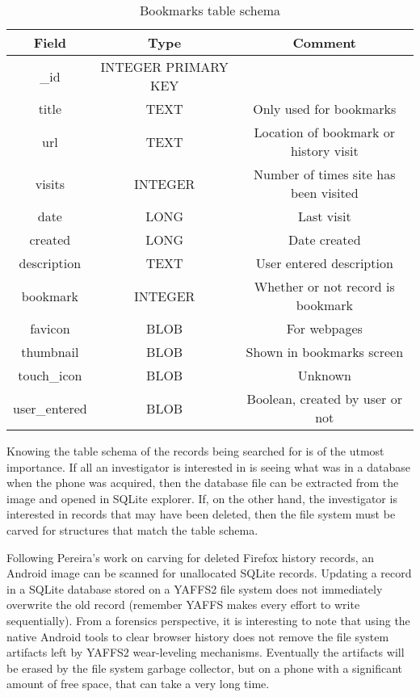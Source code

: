 \begin{table}[htb]
\begin {center}
	\begin{tabular}{| c | c | c |}
	\hline
	Field & Type & Comment \\
	\hline
	\_id & INTEGER PRIMARY KEY & \\
	title & TEXT  &  Only used for bookmarks \\
	url & TEXT  & Location of bookmark or history visit \\
	visits & INTEGER  & Number of times site has been visited \\
	date & LONG  &  Last visit \\
	created & LONG &  Date created \\
	description & TEXT &  User entered description \\
	bookmark & INTEGER & Whether or not record is bookmark \\
	favicon & BLOB &  For webpages \\
	thumbnail & BLOB &  Shown in bookmarks screen \\
	touch\_icon & BLOB &  Unknown \\
	user\_entered & BLOB & Boolean, created by user or not \\
	\hline
	\end{tabular}
\end{center}
	\caption{Bookmarks table schema}
	\label{tab:bookmarkschema}
\end{table}

Knowing the table schema of the records being searched for is of the utmost importance.  If all an investigator is interested in is
seeing what was in a database when the phone was acquired, then the database file can be extracted from the image and opened in
SQLite explorer.  If, on the other hand, the investigator is interested in records that may have been deleted, then the file system
must be carved for structures that match the table schema.

Following Pereira's work on carving for deleted Firefox history records, an Android image can be scanned for unallocated SQLite
records.  Updating a record in a SQLite database stored on a YAFFS2 file system does not immediately overwrite the old record
(remember YAFFS makes every effort to write sequentially).  From a forensics perspective, it is interesting to note that using the
native Android tools to clear browser history does not remove the file system artifacts left by YAFFS2 wear-leveling mechanisms.
Eventually the artifacts will be erased by the file system garbage collector, but on a phone with a significant amount of free space,
that can take a very long time.

